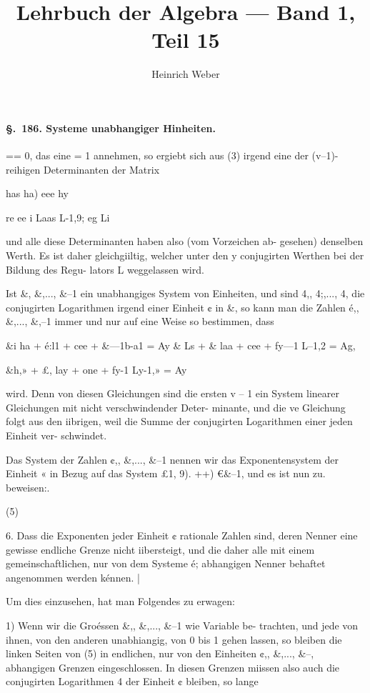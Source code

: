\documentclass[12pt,a4paper]{article}
\title{Lehrbuch der Algebra --- Band 1, Teil 15}
\author{Heinrich Weber}
\date{}
\theoremstyle{plain}
\theoremstyle{definition}
\begin{document}
\maketitle

\paragraph{\S.~186. Systeme unabhangiger Hinheiten.}


== 0, das eine = 1 annehmen, so ergiebt sich aus (3) irgend eine der (v--1)-reihigen Determinanten der Matrix

has ha) eee hy

re ee i Laas L-1,9; eg Li

und alle diese Determinanten haben also (vom Vorzeichen ab- gesehen) denselben Werth. Es ist daher gleichgiiltig, welcher unter den y conjugirten Werthen bei der Bildung des Regu- lators L weggelassen wird.

Ist \&, \&,..., \&--1 ein unabhangiges System von Einheiten, und sind 4,, 4;,..., 4, die conjugirten Logarithmen irgend einer Einheit ¢ in \&, so kann man die Zahlen é,, \&,..., \&,--1 immer und nur auf eine Weise so bestimmen, dass

\&i ha + é:l1 + cee + \&---1b-a1 = Ay \& Ls + \& laa + cee + fy---1 L--1,2 = Ag,

\&h,» + £, lay + one + fy-1 Ly-1,» = Ay

wird. Denn von diesen Gleichungen sind die ersten v -- 1 ein System linearer Gleichungen mit nicht verschwindender Deter- minante, und die ve Gleichung folgt aus den iibrigen, weil die Summe der conjugirten Logarithmen einer jeden Einheit ver- schwindet.

Das System der Zahlen ¢,, \&,..., \&--1 nennen wir das Exponentensystem der Einheit « in Bezug auf das System £1, 9). ++) €\&--1, und es ist nun zu. beweisen:.

(5)

6. Dass die Exponenten jeder Einheit ¢ rationale Zahlen sind, deren Nenner eine gewisse endliche Grenze nicht iibersteigt, und die daher alle mit einem gemeinschaftlichen, nur von dem Systeme é; abhangigen Nenner behaftet angenommen werden kénnen. |

Um dies einzusehen, hat man Folgendes zu erwagen:

1) Wenn wir die Groéssen \&,, \&,..., \&--1 wie Variable be- trachten, und jede von ihnen, von den anderen unabhiangig, von 0 bis 1 gehen lassen, so bleiben die linken Seiten von (5) in endlichen, nur von den Einheiten ¢,, \&,..., \&--, abhangigen Grenzen eingeschlossen. In diesen Grenzen miissen also auch die conjugirten Logarithmen 4 der Einheit ¢ bleiben, so lange
\end{document}
